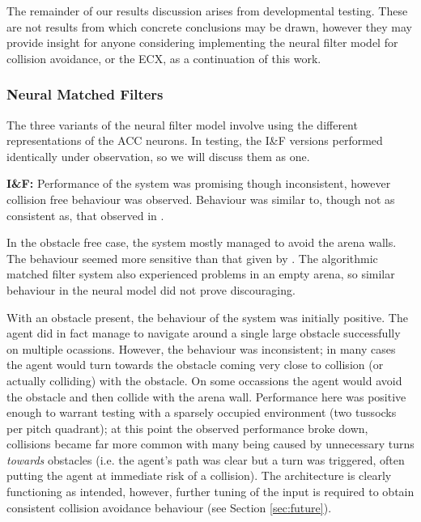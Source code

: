 \documentclass[a4paper,11pt,twoside,openright]{article}
\begin{document}
The remainder of our results discussion arises from developmental testing.
These are not results from which concrete conclusions may
be drawn, however they may provide insight for anyone considering
implementing the neural filter model for collision avoidance, or the
ECX, as a continuation of this work.

\subsubsection{Neural Matched Filters}
The three variants of the neural filter model involve using the
different representations of the ACC neurons. In testing, the I\&F
versions performed identically under observation, so we will discuss
them as one.\newline\par

\textbf{I\&F:} Performance of the system was promising though
inconsistent, however collision free behaviour was observed. Behaviour
was similar to, though not as consistent as, that observed in
\cite{Mitchell2018}.
\newline\par

In the obstacle free case, the system mostly managed to avoid the
arena walls. The behaviour seemed more sensitive than
that given by \cite{Mitchell2018}. The algorithmic matched
filter system also experienced problems in an empty arena, so similar
behaviour in the neural model did not prove discouraging.
\newline\par

With an obstacle present, the behaviour of the system was initially
positive. The agent did in fact manage to navigate around a single
large obstacle successfully on multiple ocassions. However, the
behaviour was inconsistent; in many cases the agent would turn towards
the obstacle coming very close to collision (or actually colliding)
with the obstacle. On some occassions the agent would avoid the
obstacle and then collide with the arena wall. Performance here was
positive enough to warrant testing with a sparsely occupied
environment (two tussocks per pitch quadrant); at this point the
observed performance broke down, collisions became far more common
with many being caused by unnecessary turns \textit{towards} obstacles
(i.e. the agent's path was clear but a turn was triggered, often
putting the agent at immediate risk of a collision). The architecture
is clearly functioning as intended, however, further tuning of the
input is required to obtain consistent collision avoidance behaviour
(see Section \ref{sec:future}).
\newline\par
\end{document}
